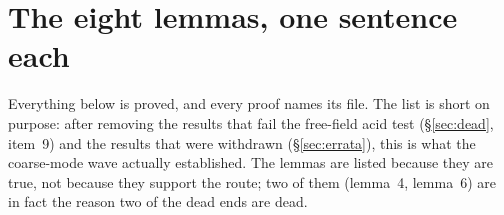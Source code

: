 \section[The eight lemmas, one sentence each]{The eight \LT{} lemmas, one sentence each}
\label{sec:lemmas}

Everything below is proved, and every proof names its file. The list is short on purpose: after
removing the results that fail the free-field acid test (\S\ref{sec:dead}, item~9) and the results
that were withdrawn (\S\ref{sec:errata}), this is what the coarse-mode wave actually established.
The lemmas are listed because they are true, not because they support the route; two of them
(lemma~4, lemma~6) are in fact the reason two of the dead ends are dead.

